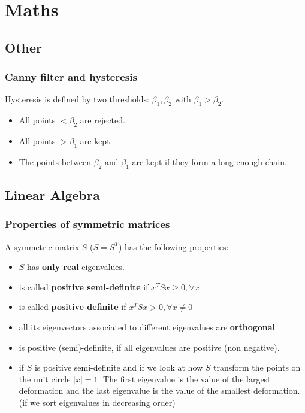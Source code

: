 \chapter{Maths}

\section{Other}
\subsection{Canny filter and hysteresis}

Hysteresis is defined by two thresholds: $\beta_1, \beta_2$ with $\beta_1 > \beta_2$.
\begin{itemize}
    \item All points $< \beta_2$ are rejected.
    \item All points $> \beta_1$ are kept.
    \item The points between $\beta_2$ and $\beta_1$ are kept if they form a long enough chain.
\end{itemize}

\section{Linear Algebra}
\subsection{Properties of symmetric matrices}
A symmetric matrix $S$ ($S = S^T$) has the following properties:
\begin{itemize}
    \item $S$ has \textbf{only real} eigenvalues.
    \item is called \textbf{positive semi-definite} if $x^TSx \geq 0, \forall x$
    \item is called \textbf{positive definite} if $x^TSx > 0, \forall x \neq 0$
    \item all its eigenvectors associated to different eigenvalues are \textbf{orthogonal}
    \item is positive (semi)-definite, if all eigenvalues are positive (non negative).
    \item if $S$ is positive semi-definite and if we look at how $S$ transform the points on the unit circle $|x|=1$. The first eigenvalue is the value of the largest deformation and the last eigenvalue is the value of the smallest deformation. (if we sort eigenvalues in decreasing order)
\end{itemize}

